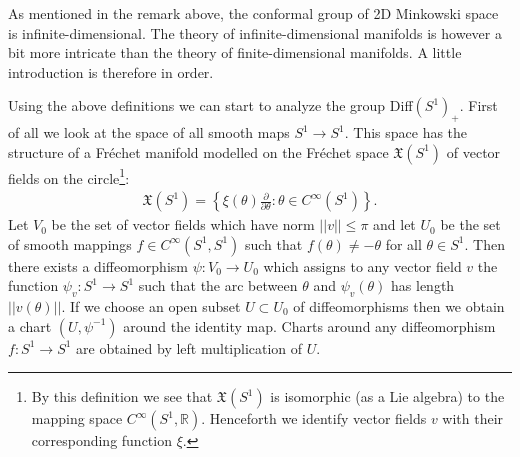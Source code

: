 	As mentioned in the remark above, the conformal group of 2D Minkowski space is infinite-dimensional. The theory of infinite-dimensional manifolds is however a bit more intricate than the theory of finite-dimensional manifolds. A little introduction is therefore in order.

	
	Using the above definitions we can start to analyze the group Diff$(S^1)_+$. First of all we look at the space of all smooth maps $S^1\rightarrow S^1$. This space has the structure of a Fr\'echet manifold modelled on the Fr\'echet space $\mathfrak{X}(S^1)$ of vector fields on the circle\footnote{By this definition we see that $\mathfrak{X}(S^1)$ is isomorphic (as a Lie algebra) to the mapping space $C^\infty(S^1, \mathbb{R})$. Henceforth we identify vector fields $v$ with their corresponding function $\xi$.}:
	\begin{gather}
		\mathfrak{X}(S^1) = \left\{\xi(\theta)\frac{\partial}{\partial\theta}:\theta\in C^\infty(S^1)\right\}.
	\end{gather}
	Let $V_0$ be the set of vector fields which have norm $||v||\leq\pi$ and let $U_0$ be the set of smooth mappings $f\in C^\infty(S^1, S^1)$ such that $f(\theta)\neq-\theta$ for all $\theta\in S^1$. Then there exists a diffeomorphism $\psi:V_0\rightarrow U_0$ which assigns to any vector field $v$ the function $\psi_v:S^1\rightarrow S^1$ such that the arc between $\theta$ and $\psi_v(\theta)$ has length $||v(\theta)||$. If we choose an open subset $U\subset U_0$ of diffeomorphisms then we obtain a chart $(U, \psi^{-1})$ around the identity map. Charts around any diffeomorphism $f:S^1\rightarrow S^1$ are obtained by left multiplication of $U$.
	
